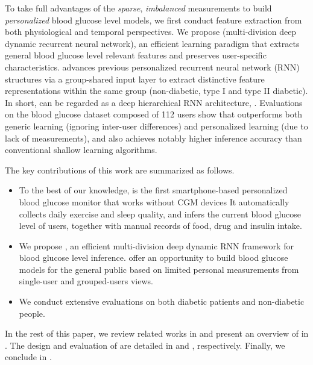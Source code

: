To take full advantages of the \textit{sparse}, \textit{imbalanced} measurements to build \textit{personalized} blood glucose level models, we first conduct feature extraction from both physiological and temporal perspectives.
We propose \modelname (multi-division deep dynamic recurrent neural network), an efficient learning paradigm that extracts general blood glucose level relevant features and preserves user-specific characteristics.
\modelname advances previous personalized recurrent neural network (RNN) structures via a group-shared input layer to extract distinctive feature representations within the same group (\ie non-diabetic, type I and type II diabetic).
In short, \modelname can be regarded as a deep hierarchical RNN architecture, .
Evaluations on the blood glucose dataset composed of 112 users  show that \modelname outperforms both generic learning (\ie ignoring inter-user differences) and personalized learning (due to lack of measurements), and also achieves notably higher inference accuracy than conventional shallow learning algorithms.

The key contributions of this work are summarized as follows.
\begin{itemize}
  \item
  To the best of our knowledge, \sysname is the first smartphone-based personalized blood glucose monitor that works without CGM devices 
  It automatically collects daily exercise and sleep quality, and infers the current blood glucose level of users, together with manual records of food, drug and insulin intake.
  \item
  We propose \modelname, an efficient multi-division deep dynamic RNN framework for blood glucose level inference.
   offer an opportunity to build blood glucose models for the general public based on limited personal measurements from single-user and grouped-users views.
  \item
  We conduct extensive evaluations on both diabetic patients and non-diabetic people.
\end{itemize}

In the rest of this paper, we review related works in  and present an overview of \sysname in .
The design and evaluation of \sysname are detailed in  and , respectively.
Finally, we conclude in .

